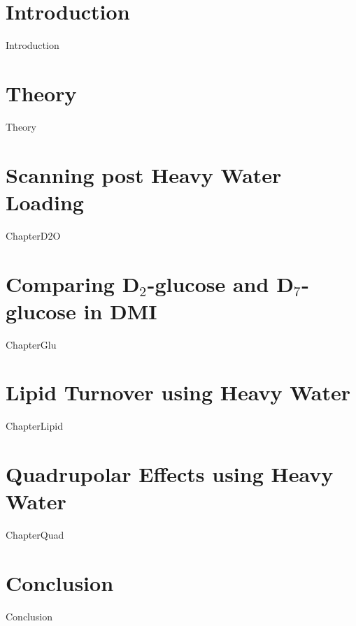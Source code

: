 \documentclass[12pt,english]{report}
\begin{document}
\newpage
\mbox{}

\chapter{Introduction}
\setcounter{page}{1}

\fancyhead[RO]{\color{gray} \nouppercase{\rightmark}}
\fancyhead[LE]{\color{gray} \nouppercase{\leftmark}}

{Introduction}

\chapter{Theory}
{Theory}

\chapter{Scanning post Heavy Water Loading}
{ChapterD2O}

\chapter{Comparing D$_2$-glucose and D$_7$-glucose in DMI}
{ChapterGlu}

\chapter{Lipid Turnover using Heavy Water}
{ChapterLipid}

\chapter{Quadrupolar Effects using Heavy Water}
{ChapterQuad}

\chapter{Conclusion}
{Conclusion}

%
\newpage
\printbibliography
\end{document}
